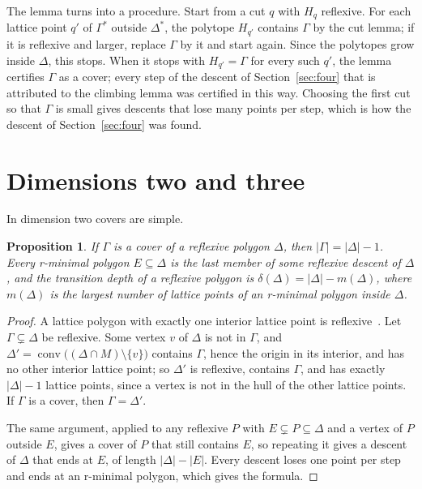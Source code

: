 \documentclass[manuscript]{aomart}
\newtheorem{proposition}[theorem]{Proposition}
\theoremstyle{definition}
\theoremstyle{remark}
\newcommand{\conv}{\operatorname{conv}}
\begin{document}
The lemma turns into a procedure. Start from a cut $q$ with $H_q$
reflexive. For each lattice point $q'$ of $\Gamma^*$ outside $\Delta^*$,
the polytope $H_{q'}$ contains $\Gamma$ by the cut lemma; if it is
reflexive and larger, replace $\Gamma$ by it and start again. Since the
polytopes grow inside $\Delta$, this stops. When it stops with
$H_{q'}=\Gamma$ for every such $q'$, the lemma certifies $\Gamma$ as a
cover; every step of the descent of Section~\ref{sec:four} that is
attributed to the climbing lemma was certified in this way. Choosing the first cut so that $\Gamma$ is small
gives descents that lose many points per step, which is how the descent
of Section~\ref{sec:four} was found.

\section{Dimensions two and three}\label{sec:low}

In dimension two covers are simple.

\begin{proposition}\label{prop:twod}
If $\Gamma$ is a cover of a reflexive polygon $\Delta$, then
$|\Gamma|=|\Delta|-1$. Every r-minimal polygon $E\subseteq\Delta$ is the
last member of some reflexive descent of $\Delta$, and the transition depth
of a reflexive polygon is $\delta(\Delta)=|\Delta|-m(\Delta)$, where
$m(\Delta)$ is the largest number of lattice points of an r-minimal polygon
inside $\Delta$.
\end{proposition}

\begin{proof}
A lattice polygon with exactly one interior lattice point is
reflexive~\cite{PRV00}. Let $\Gamma\subsetneq\Delta$ be reflexive. Some
vertex $v$ of $\Delta$ is not in $\Gamma$, and
$\Delta'=\conv\bigl((\Delta\cap M)\setminus\{v\}\bigr)$ contains $\Gamma$,
hence the origin in its interior, and has no other interior lattice point;
so $\Delta'$ is reflexive, contains $\Gamma$, and has exactly
$|\Delta|-1$ lattice points, since a vertex is not in the hull of the
other lattice points. If $\Gamma$ is a cover, then $\Gamma=\Delta'$.

The same argument, applied to any reflexive $P$ with $E\subsetneq
P\subseteq\Delta$ and a vertex of $P$ outside $E$, gives a cover of $P$
that still contains $E$, so repeating it gives a descent of $\Delta$ that
ends at $E$, of length $|\Delta|-|E|$. Every descent loses one point per
step and ends at an r-minimal polygon, which gives the formula.
\end{proof}
\end{document}
